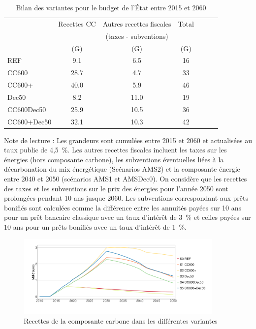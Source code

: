 \documentclass[10.5pt,a4paper]{article}
\def\euro{\mbox{\raisebox{.25ex}{{\it =}}\hspace{-.5em}{\sf C}}}
\begin{document}
{\begin{table}[h] \caption{Bilan des variantes pour le budget de l’État entre 2015 et 2060}\label{Bilan_Etat_CC}
\begin{center}
\begin{tabular}[c]{|l|c|c|c|c|c|c|}
\hline
								&Recettes CC & Autres recettes fiscales & Total \\
								& 					 & (taxes - subventions) & \\
								&		(G\euro) & (G\euro) 					& (G\euro)	 \\			
\hline
REF 				&9.1 			 &6.5 	&16 \\
CC600 			& 28.7 		 &4.7 	&33 \\
CC600+ 			&40.0 		 &5.9 	&46 \\
Dec50 			&8.2 			 &11.0 	&19 \\
CC600Dec50 	&25.9			 &10.5 	&36 \\
CC600+Dec50	&32.1			 &10.3 	&42 \\
\hline
\end{tabular}
\end{center}
\footnotesize{Note de lecture : Les grandeurs sont cumulées entre 2015 et 2060 et actualisées au taux public de 4,5~\%.  Les autres recettes fiscales incluent les taxes sur les énergies (hors composante carbone), les subventions éventuelles liées à la décarbonation du mix énergétique (Scénarios AMS2) et la composante énergie entre 2040 et 2050 (scénarios AMS1 et AMSDec0). On considère que les recettes des taxes et les subventions sur le prix des énergies pour l'année 2050 sont prolongées pendant 10 ans jusque 2060. Les subventions correspondant aux prêts bonifiés sont calculées comme la différence entre les annuités payées sur 10 ans pour un prêt bancaire classique avec un taux d'intérêt de 3~\% et celles payées sur 10 ans pour un prêts bonifiés avec un taux d'intérêt de 1~\%.}
\end{table}


\begin{figure}[h!]
\centering 
\caption{Recettes de la composante carbone dans les différentes variantes}\label{Evol_Recettes_CC-1}  
\includegraphics[width = 0.9\textwidth]{Evol_Recettes_CC-1}  
\end{figure}

}
\end{document}
